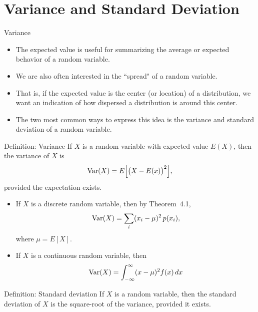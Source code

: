 \section{Variance and Standard Deviation}

\begin{frame}[allowframebreaks]{Variance}
  \begin{itemize}
    \item The expected value is useful for summarizing the average or expected behavior of a random variable.
    \item We are also often interested in the ``spread" of a random variable.
    \item That is, if the expected value is the center (or location) of a distribution, we want an indication of how dispersed a distribution is around this center.
    \item The two most common ways to express this idea is the \alert{variance} and \alert{standard deviation} of a random variable.
  \end{itemize}
  
  \framebreak
  
  \begin{block}{Definition: Variance}
    If $X$ is a random variable with expected value $E(X)$, then the \alert{variance} of $X$ is
    $$
    \mathrm{Var}(X) = E\Big[\big(X - E(x)\big)^2\Big],
    $$
    provided the expectation exists.
  \end{block}
  
  \begin{itemize}
    \item If $X$ is a discrete random variable, then by Theorem~4.1, 
    $$
    \mathrm{Var}(X) = \sum_{i}(x_i - \mu)^2\,p(x_i),
    $$
    where $\mu = E[X]$.
    \item If $X$ is a continuous random variable, then
    $$
    \mathrm{Var}(X) = \int_{-\infty}^\infty (x- \mu)^2 f(x)\, dx
    $$
  \end{itemize}
  
  \framebreak
  
  \begin{block}{Definition: Standard deviation}
    If $X$ is a random variable, then the standard deviation of $X$ is the square-root of the variance, provided it exists. 
  \end{block}
  

\end{frame}
